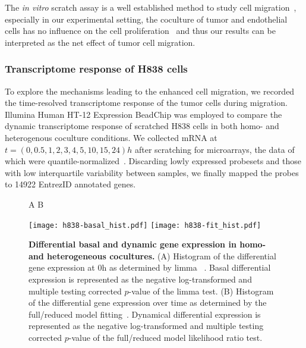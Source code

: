 The \emph{in vitro} scratch assay is a well established method
to study cell migration~\citep{Busch2008,Liang2007}, especially
in our experimental setting, the coculture of tumor and 
endothelial cells has no influence on the cell proliferation~%
\citep{Dauscher2012} and thus our results can be interpreted
as the net effect of tumor cell migration.

\subsubsection{Transcriptome response of H838 cells}

To explore the mechanisms leading to the enhanced cell migration, we recorded the time-resolved transcriptome response of the tumor cells during migration.
Illumina Human HT-12 Expression BeadChip was employed to compare the dynamic transcriptome response of scratched H838 cells in both homo- and heterogenous coculture conditions.
We collected mRNA at $t=(0,0.5,1,2,3,4,5,10,15,24)h$ after scratching for microarrays,
the data of which were quantile-normalized~\citep{Dunning2008a}.  
Discarding lowly expressed probesets and those with low interquartile 
variability between samples, we finally mapped the probes to 14922 EntrezID 
annotated genes. 

\begin{figure}[!ht]
\hskip 0.5in A \hskip 2.5in B
\begin{center}
\texttt{[image: h838-basal\_hist.pdf]}
\texttt{[image: h838-fit\_hist.pdf]}
\end{center}
\caption[Differential basal and dynamic gene expression]{
{\bf Differential basal and dynamic gene expression in homo- and heterogeneous 
cocultures.} 
(A) Histogram of the differential gene expression at 0h as determined by limma~%
\citep{Smyth2004}. 
Basal differential expression is 
represented as the negative log-transformed and multiple
testing corrected $p$-value of the limma test.
(B) Histogram of the differential gene expression over time as determined by the
full/reduced model fitting~\citep{Mar2009}.
Dynamical differential expression is 
represented as the negative log-transformed and multiple
testing corrected $p$-value of the full/reduced model
likelihood ratio test.
}
\label{fig:h838_transcriptome}
\end{figure}

